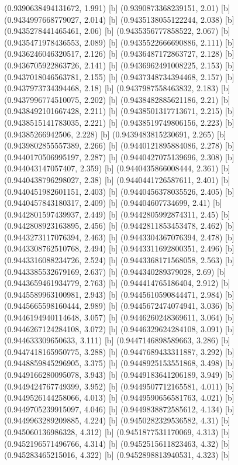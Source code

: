 {{{(0.9390638494131672, 1.991) [b] 
(0.9390873368239151, 2.01) [b] 
(0.9434997668779027, 2.014) [b] 
(0.9435138055122244, 2.038) [b] 
(0.9435278441465461, 2.06) [b] 
(0.9435356777858522, 2.067) [b] 
(0.9435471978436553, 2.089) [b] 
(0.9435522666690886, 2.111) [b] 
(0.9436246046320517, 2.126) [b] 
(0.9436487172863727, 2.128) [b] 
(0.9436705922863726, 2.141) [b] 
(0.9436962491008225, 2.153) [b] 
(0.9437018046563781, 2.155) [b] 
(0.9437348734394468, 2.157) [b] 
(0.9437973734394468, 2.18) [b] 
(0.9437987558463832, 2.183) [b] 
(0.9437996774510075, 2.202) [b] 
(0.9438482885621186, 2.21) [b] 
(0.9438492101667428, 2.211) [b] 
(0.9438501317713671, 2.215) [b] 
(0.9438515141783035, 2.221) [b] 
(0.9438519749806156, 2.223) [b] 
(0.94385266942506, 2.228) [b] 
(0.9439483815230691, 2.265) [b] 
(0.9439802855557389, 2.266) [b] 
(0.9440121895884086, 2.278) [b] 
(0.9440170506995197, 2.287) [b] 
(0.9440427075139696, 2.308) [b] 
(0.944043147057407, 2.359) [b] 
(0.9440435866008444, 2.361) [b] 
(0.9440438796298027, 2.38) [b] 
(0.9440441726587611, 2.401) [b] 
(0.9440451982601151, 2.403) [b] 
(0.9440456378035526, 2.405) [b] 
(0.9440457843180317, 2.409) [b] 
(0.94404607734699, 2.41) [b] 
(0.9442801597439937, 2.449) [b] 
(0.9442805992874311, 2.45) [b] 
(0.9442808923163895, 2.456) [b] 
(0.9442811853453478, 2.462) [b] 
(0.9443273117076394, 2.463) [b] 
(0.9443304367076394, 2.478) [b] 
(0.9443308762510768, 2.494) [b] 
(0.9443311692800351, 2.496) [b] 
(0.9443316088234726, 2.524) [b] 
(0.9443368171568058, 2.563) [b] 
(0.9443385532679169, 2.637) [b] 
(0.944340289379028, 2.69) [b] 
(0.9443659461934779, 2.763) [b] 
(0.944414765186404, 2.912) [b] 
(0.9445589963100981, 2.943) [b] 
(0.9445610590844471, 2.984) [b] 
(0.9445665598160444, 2.989) [b] 
(0.9445672474074941, 3.036) [b] 
(0.9446194940114648, 3.057) [b] 
(0.9446260248369611, 3.064) [b] 
(0.9446267124284108, 3.072) [b] 
(0.9446329624284108, 3.091) [b] 
(0.944633309650633, 3.111) [b] 
(0.9447146898589663, 3.286) [b] 
(0.9447418165950775, 3.288) [b] 
(0.9447689433311887, 3.292) [b] 
(0.9448859845296905, 3.375) [b] 
(0.9448925153551868, 3.498) [b] 
(0.9449166280095078, 3.943) [b] 
(0.9449183641206189, 3.949) [b] 
(0.9449424767749399, 3.952) [b] 
(0.9449507712165581, 4.011) [b] 
(0.9449526144258066, 4.013) [b] 
(0.9449590656581763, 4.021) [b] 
(0.9449705239915097, 4.046) [b] 
(0.9449838872585612, 4.134) [b] 
(0.9449963289209885, 4.224) [b] 
(0.9450282329536582, 4.31) [b] 
(0.945060136986328, 4.312) [b] 
(0.9451877531170069, 4.313) [b] 
(0.9452196571496766, 4.314) [b] 
(0.9452515611823463, 4.32) [b] 
(0.945283465215016, 4.322) [b] 
(0.9452898813940531, 4.323) [b] 
}}}
